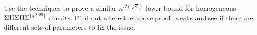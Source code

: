 \begin{exercise}
Use the techniques to prove a similar $n^{\Omega(\sqrt{d})}$ lower bound for homogeneous $\Sigma\Pi\Sigma\Pi\Sigma^{[n^{0.99}]}$ circuits. Find out where the above proof breaks and see if there are different sets of parameters to fix the issue. 
\end{exercise}









